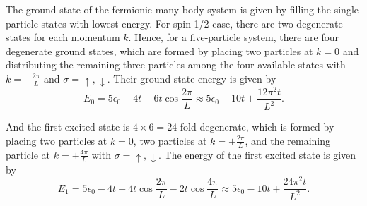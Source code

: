 \documentclass[a4paper,11pt]{article}
\begin{document}
The ground state of the fermionic many-body system is given by filling the single-particle states with lowest energy. For spin-1/2 case, there are two degenerate states for each momentum $k$. Hence, for a five-particle system, there are four degenerate ground states, which are formed by placing two particles at $k=0$ and distributing the remaining three particles among the four available states with $k=\pm\frac{2\pi}{L}$ and $\sigma=\uparrow,\downarrow$. Their ground state energy is given by
\begin{equation}
  E_0 = 5\epsilon_0 - 4t - 6t\cos\frac{2\pi}{L} \approx 5\epsilon_0 - 10t + \frac{12\pi^2 t}{L^2}.
\end{equation}

And the first excited state is $4\times 6 = 24$-fold degenerate, which is formed by placing two particles at $k=0$, two particles at $k=\pm\frac{2\pi}{L}$, and the remaining particle at $k=\pm\frac{4\pi}{L}$ with $\sigma=\uparrow,\downarrow$. The energy of the first excited state is given by
\begin{equation}
  E_1 = 5\epsilon_0 - 4t - 4t\cos\frac{2\pi}{L} - 2t\cos\frac{4\pi}{L} \approx 5\epsilon_0 - 10t + \frac{24\pi^2 t}{L^2}.
\end{equation}
\end{document}
